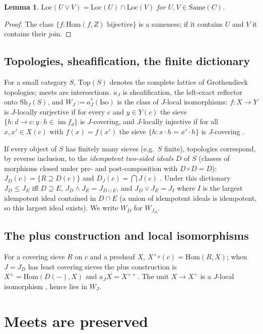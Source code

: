 \documentclass[11pt]{amsart}
\newtheorem{lem}[thm]{Lemma}
\theoremstyle{definition}
\newcommand{\Same}{\mathrm{Same}}
\newcommand{\Top}{\mathrm{Top}}
\newcommand{\Iso}{\mathrm{Iso}}
\newcommand{\Sh}{\mathrm{Sh}}
\newcommand{\Loc}{\mathrm{Loc}}
\newcommand{\Hom}{\mathrm{Hom}}
\begin{document}
\begin{lem}\label{lem:loc}
$\Loc(U\vee V)=\Loc(U)\cap\Loc(V)$ for $U,V\in\Same(C)$.
\end{lem}
\begin{proof}
The class $\{f:\Hom(f,Z)\text{ bijective}\}$ is a sameness; if it contains
$U$ and $V$ it contains their join.
\end{proof}

\subsection{Topologies, sheafification, the finite dictionary}
For a small category $S$, $\Top(S)$ denotes the complete lattice of
Grothendieck topologies; meets are intersections. $a_J$ is sheafification, the
left-exact reflector onto $\Sh_J(S)$, and $W_J:=a_J^*(\Iso)$ is the class of
$J$-local isomorphisms: $f\colon X\to Y$ is $J$-locally surjective if for every
$c$ and $y\in Y(c)$ the sieve $\{h\colon d\to c: y\cdot h\in\operatorname{im}f_d\}$ is
$J$-covering, and $J$-locally injective if for all $x,x'\in X(c)$ with
$f(x)=f(x')$ the sieve $\{h: x\cdot h=x'\cdot h\}$ is $J$-covering
\cite[III.7]{MLM}.

If every object of $S$ has finitely many sieves (e.g.\ $S$ finite),
topologies correspond, by reverse inclusion, to the \emph{idempotent two-sided
ideals} $D$ of $S$ (classes of morphisms closed under pre- and post-composition
with $D\circ D=D$): $J_D(c)=\{R\supseteq D(c)\}$ and $D_J(c)=\bigcap J(c)$
\cite[Thm.~5.1]{Postnikov}. Under this dictionary $J_D\le J_E$ iff $D\supseteq E$,
$J_D\wedge J_E=J_{D\cup E}$, and $J_D\vee J_E=J_{I}$ where $I$ is the largest
idempotent ideal contained in $D\cap E$ (a union of idempotent ideals is
idempotent, so this largest ideal exists). We write $W_D$ for $W_{J_D}$.

\subsection{The plus construction and local isomorphisms}
For a covering sieve $R$ on $c$ and a presheaf $X$, $X^{+_R}(c)=\Hom(R,X)$;
when $J=J_D$ has least covering sieves the plus construction is $X^+=\Hom(D(-),X)$
and $a_JX=X^{++}$. The unit $X\to X^+$ is a $J$-local isomorphism
\cite[III.5]{MLM}, hence lies in $W_J$.

\section{Meets are preserved}
\end{document}
